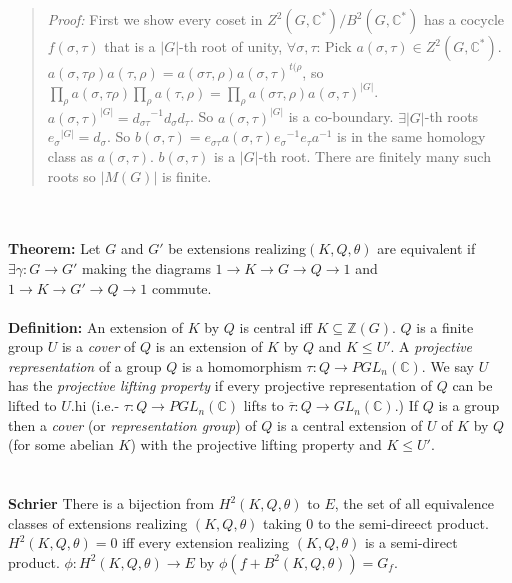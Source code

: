 \begin{quote}
\emph{Proof:}
First we show every coset in $Z^2(G, {\mathbb C}^*)/B^2(G, {\mathbb C}^*)$ has a cocycle $f(\sigma, \tau)$ that
is a $|G|$-th root of unity, $\forall \sigma, \tau$: Pick $a(\sigma, \tau) \in Z^2(G, {\mathbb C}^*)$.
$a(\sigma, \tau \rho) a(\tau, \rho) = a(\sigma \tau, \rho) a(\sigma, \tau)^{t(\rho}$, so
$\prod_{\rho} a(\sigma, \tau \rho) \prod_{\rho} a(\tau, \rho) = \prod_{\rho} a(\sigma \tau, \rho) a(\sigma, \tau)^{|G|}$.
$a(\sigma, \tau)^{|G|} = {d_{\sigma \tau}}^{-1} d_{\sigma} d_{\tau}$.  So $a(\sigma, \tau)^{|G|}$ is a co-boundary.
$\exists |G|$-th roots ${e_{\sigma}}^{|G|} = d_{\sigma}$.
So $b(\sigma, \tau) = e_{\sigma \tau} a(\sigma, \tau) {e_{\sigma}}^{-1} {{e_\tau}a}^{-1}$ is in the same homology class as
$a(\sigma , \tau)$.  $b(\sigma , \tau)$ is a $|G|$-th root.  There are finitely many such roots so $|M(G)|$ is finite.
\end{quote}
\\
\\
{\bf Theorem:} Let $G$ and $G'$ be extensions realizing$(K,Q, \theta)$ are equivalent if
$\exists \gamma: G \rightarrow G'$ making the diagrams
$1 \rightarrow K \rightarrow G \rightarrow Q \rightarrow 1$ and
$1 \rightarrow K \rightarrow G' \rightarrow Q \rightarrow 1$ commute.
\\
\\
{\bf Definition:} An extension of $K$ by $Q$ is central iff $ K \subseteq {\mathbb Z}(G)$.
$Q$ is a finite group $U$ is a \emph{cover} of $Q$
is an extension of $K$ by $Q$ and $K \leq U'$.
A \emph{projective representation} of a group $Q$ is a homomorphism
$\tau: Q \rightarrow PGL_n({\mathbb C})$.
We say $U$ has the \emph{projective lifting property} if every projective representation
of $Q$ can be lifted to $U$.hi (i.e.- $\tau:Q \rightarrow PGL_n({\mathbb C})$ lifts to
${\overline {\tau}}: Q \rightarrow GL_n({\mathbb C})$.)
If $Q$ is a group then a \emph{cover} (or \emph{representation group}) of $Q$ is a
central extension of $U$ of $K$ by $Q$ (for some abelian $K$) with the projective lifting property
and $K \le U'$.
\\
\\
\\
{\bf Schrier} There is a bijection from $H^2(K, Q, \theta)$ to $E$, the set of all equivalence classes
of extensions realizing $(K,Q,\theta)$ taking $0$ to the semi-direect product.  $H^2(K, Q, \theta) = 0$
iff every extension realizing $(K, Q, \theta)$ is a semi-direct product.  $\phi: H^2(K, Q, \theta) \rightarrow E$
by $\phi(f +  B^2(K,Q, \theta)) = G_{f}$.
